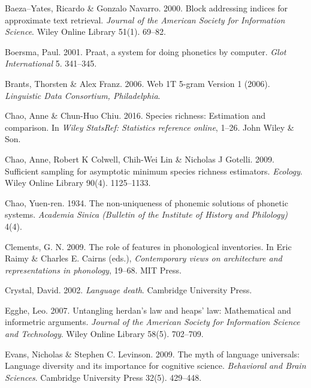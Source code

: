 \documentclass[
]{article}
\newlength{\cslhangindent}
\newlength{\cslentryspacingunit} %
\newenvironment{CSLReferences}[2] %
 {%
  \setlength{\parindent}{0pt}
  \ifodd #1
  \let\oldpar\par
  \def\par{\hangindent=\cslhangindent\oldpar}
  \fi
  \setlength{\parskip}{#2\cslentryspacingunit}
 }%
 {}
\begin{document}
\hypertarget{refs}{}
\begin{CSLReferences}{1}{0}
\leavevmode{}%
Baeza--Yates, Ricardo \& Gonzalo Navarro. 2000. Block addressing indices
for approximate text retrieval. \emph{Journal of the American Society
for Information Science}. Wiley Online Library 51(1). 69--82.

\leavevmode{}%
Boersma, Paul. 2001. Praat, a system for doing phonetics by computer.
\emph{Glot International} 5. 341--345.

\leavevmode{}%
Brants, Thorsten \& Alex Franz. 2006. {Web 1T 5-gram Version 1 (2006)}.
\emph{Linguistic Data Consortium, Philadelphia}.

\leavevmode{}%
Chao, Anne \& Chun-Huo Chiu. 2016. Species richness: Estimation and
comparison. In \emph{Wiley StatsRef: Statistics reference online},
1--26. John Wiley \& Son.

\leavevmode{}%
Chao, Anne, Robert K Colwell, Chih-Wei Lin \& Nicholas J Gotelli. 2009.
Sufficient sampling for asymptotic minimum species richness estimators.
\emph{Ecology}. Wiley Online Library 90(4). 1125--1133.

\leavevmode{}%
Chao, Yuen-ren. 1934. The non-uniqueness of phonemic solutions of
phonetic systems. \emph{Academia Sinica (Bulletin of the Institute of
History and Philology)} 4(4).

\leavevmode{}%
Clements, G. N. 2009. The role of features in phonological inventories.
In Eric Raimy \& Charles E. Cairns (eds.), \emph{Contemporary views on
architecture and representations in phonology}, 19--68. MIT Press.

\leavevmode{}%
Crystal, David. 2002. \emph{Language death}. Cambridge University Press.

\leavevmode{}%
Egghe, Leo. 2007. Untangling herdan's law and heaps' law: Mathematical
and informetric arguments. \emph{Journal of the American Society for
Information Science and Technology}. Wiley Online Library 58(5).
702--709.

\leavevmode{}%
Evans, Nicholas \& Stephen C. Levinson. 2009. The myth of language
universals: Language diversity and its importance for cognitive science.
\emph{Behavioral and Brain Sciences}. Cambridge University Press 32(5).
429--448.


\end{CSLReferences}
\end{document}
